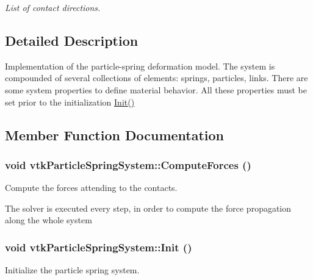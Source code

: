 \begin{DoxyCompactItemize}
\begin{DoxyCompactList}\small\item\em List of contact directions. \item\end{DoxyCompactList}\end{DoxyCompactItemize}


\subsection{Detailed Description}
Implementation of the particle-\/spring deformation model. The system is compounded of several collections of elements: springs, particles, links. There are some system properties to define material behavior. All these properties must be set prior to the initialization \hyperlink{classvtkParticleSpringSystem_aa1919a0d14b1087fb1c743daa0ad4447}{Init()} 

\subsection{Member Function Documentation}
\hypertarget{classvtkParticleSpringSystem_aff8c9dfdb8701c016a25783e7d69dc49}{
\subsubsection[{ComputeForces}]{\setlength{\rightskip}{0pt plus 5cm}void vtkParticleSpringSystem::ComputeForces ()}}
\label{classvtkParticleSpringSystem_aff8c9dfdb8701c016a25783e7d69dc49}


Compute the forces attending to the contacts. 

The solver is executed every step, in order to compute the force propagation along the whole system \hypertarget{classvtkParticleSpringSystem_aa1919a0d14b1087fb1c743daa0ad4447}{
\subsubsection[{Init}]{\setlength{\rightskip}{0pt plus 5cm}void vtkParticleSpringSystem::Init ()}}
\label{classvtkParticleSpringSystem_aa1919a0d14b1087fb1c743daa0ad4447}


Initialize the particle spring system. 

